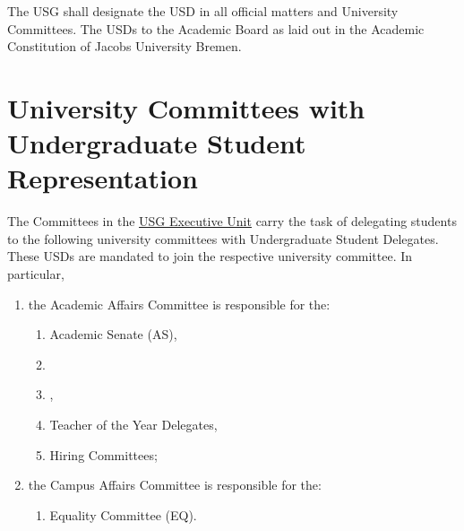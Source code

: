 
The USG shall designate the \ac{USD} in all official matters and University Committees. The USDs  to the Academic Board as laid out in the Academic Constitution of Jacobs University Bremen. 

\section{University Committees with Undergraduate Student Representation}
The Committees in the \hyperref[USGexecutiveUnitDef]{USG Executive Unit} carry the task of delegating students to the following university committees with Undergraduate Student Delegates. These USDs are mandated to join the respective university committee. In particular,
\begin{enumerate}
\item the Academic Affairs Committee is responsible for  the:
\begin{enumerate}
    \item Academic Senate (AS),
    \item {}
    \item {},
    \item Teacher of the Year Delegates,
    \item Hiring Committees;
\end{enumerate}
\item the Campus Affairs Committee is responsible for  the:
\begin{enumerate}
    \item Equality Committee (EQ).
\end{enumerate}
\end{enumerate}


